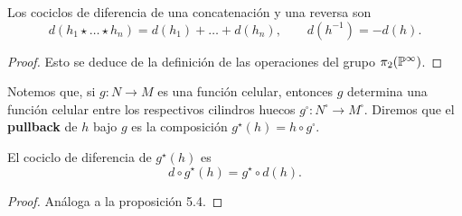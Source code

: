 \begin{proposition}
Los cociclos de diferencia de una concatenación y una reversa son
$$d(h_1 \star \dots \star h_n) = d(h_1) + \dots + d(h_n), \qquad d(h^{-1}) = -d(h).$$
\end{proposition}

\begin{proof}
Esto se deduce de la definición de las operaciones del grupo $\pi_2(\P^\infty)$.
\end{proof}

Notemos que, si $g : N \to M$ es una función celular, entonces $g$ determina una función celular entre los respectivos cilindros huecos $g^\square : N^\square \to M^\square$. Diremos que el \textbf{pullback} de $h$ bajo $g$ es la composición $g^\star(h) = h \circ g^\square$.

\begin{proposition}[Naturalidad]
El cociclo de diferencia de $g^\star(h)$ es
$$d \circ g^\star(h) = g^\star \circ d(h).$$
\end{proposition}

\begin{proof}
Análoga a la proposición 5.4.
\end{proof}
